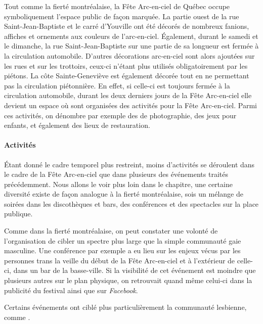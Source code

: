 Tout comme la fierté montréalaise, la Fête Arc-en-ciel de Québec occupe symboliquement l'espace public de façon marquée.
La partie ouest de la rue Saint-Jean-Baptiste et le carré d'Youville ont été décorés de nombreux fanions, affiches et ornements aux couleurs de l'arc-en-ciel.
Également, durant le samedi et le dimanche, la rue Saint-Jean-Baptiste sur une partie de sa longueur est fermée à la circulation automobile.
D'autres décorations arc-en-ciel sont alors ajoutées sur les rues et sur les trottoirs, ceux-ci n'étant plus utilisés obligatoirement par les piétons.
La côte Sainte-Geneviève est également décorée tout en ne permettant pas la circulation piétonnière.
En effet, si celle-ci est toujours fermée à la circulation automobile, durant les deux derniers jours de la Fête Arc-en-ciel elle devient un espace où sont organisées des activités pour la Fête Arc-en-ciel. Parmi ces activités, on dénombre par exemple des  de photographie, des jeux pour enfants, et également des lieux de restauration.

\paragraph{Activités}
\label{subsec:activitesfetearcenciel}
Étant donné le cadre temporel plus restreint, moins d'activités se déroulent dans le cadre de la Fête Arc-en-ciel que dans plusieurs des événements traités précédemment.
Nous allons le voir plus loin dans le chapitre, une certaine diversité existe de façon analogue à la fierté montréalaise, sois un mélange de soirées dans les discothèques et bars, des conférences et des spectacles sur la place publique.

Comme dans la fierté montréalaise, on peut constater une volonté de l'organisation de cibler un spectre plus large que la simple communauté gaie masculine.
Une conférence par exemple a eu lieu sur les enjeux vécus par les personnes trans la veille du début de la Fête Arc-en-ciel et à l'extérieur de celle-ci, dans un bar de la basse-ville.
Si la visibilité de cet événement est moindre que plusieurs autres sur le plan physique, on retrouvait quand même celui-ci dans la publicité du festival ainsi que sur \emph{Facebook}.

Certains événements ont ciblé plus particulièrement la communauté lesbienne, comme .

